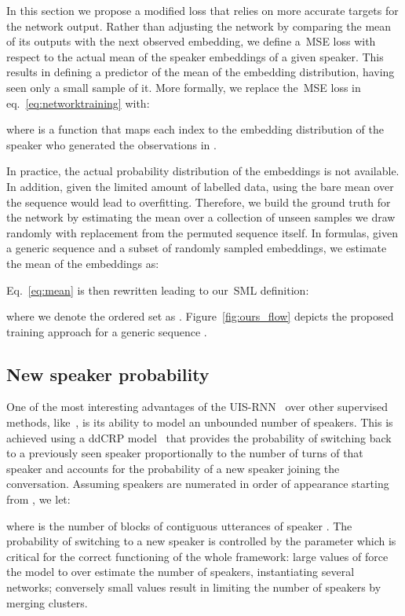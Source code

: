 \documentclass{article}
\begin{document}
In this section we propose a modified loss that relies on more accurate targets for the network output. Rather than adjusting the network by comparing the mean of its outputs with the next observed embedding, we define a~\ac{MSE} loss with respect to the actual mean of the speaker embeddings of a given speaker. This results in defining a predictor of the mean of the embedding distribution, having seen only a small sample of it. 
More formally, we replace the~\ac{MSE} loss in eq.~\ref{eq:networktraining} with: 

where  is a function that maps each index  to the embedding distribution of the speaker who generated the observations in . 

In practice, the actual probability distribution of the embeddings is not available. In addition, given the limited amount of labelled data, using the bare mean over the sequence would lead to overfitting. Therefore, we build the ground truth for the network by estimating the mean over a collection of unseen samples we draw randomly with replacement from the permuted sequence itself. In formulas, given a generic sequence  and a subset  of  randomly sampled embeddings, we estimate the mean of the embeddings as:

Eq.~\ref{eq:mean} is then rewritten leading to our~\ac{SML} definition:

where we denote the ordered set  as . Figure~\ref{fig:ours_flow} depicts the proposed training approach for a generic sequence .





\subsection{New speaker probability}
\label{sec:crp_alpha}
One of the most interesting advantages of the UIS-RNN~\cite{zhang2019fully} over other supervised methods, like~\cite{Fujita_2019}, is its ability to model an unbounded number of speakers. This is achieved using a \ac{ddCRP} model~\cite{blei2011distance} that provides the probability of switching back to a previously seen speaker proportionally to the number of turns of that speaker and accounts for the probability of a new speaker joining the conversation. Assuming speakers are numerated in order of appearance starting from , we let:

where  is the number of blocks of contiguous utterances of speaker . The probability of switching to a new speaker is controlled by the parameter  which is critical for the correct functioning of the whole framework: large values of  force the model to over estimate the number of speakers, instantiating several networks; conversely small values result in limiting the number of speakers by merging clusters.
\end{document}
